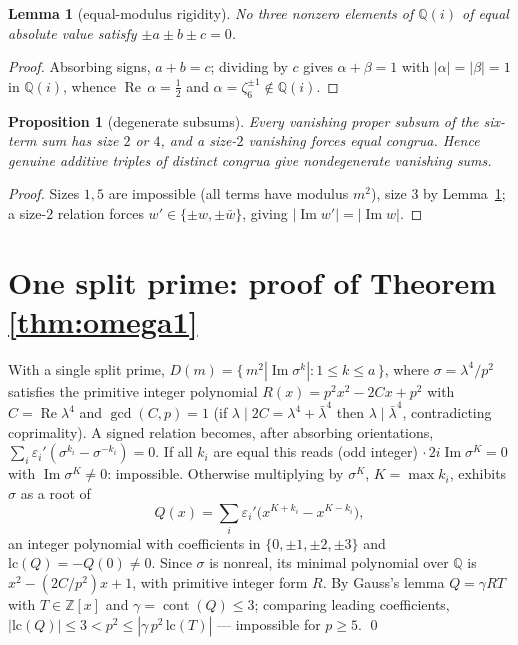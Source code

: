 \documentclass[11pt]{amsart}
\newtheorem{lemma}[theorem]{Lemma}
\newtheorem{proposition}[theorem]{Proposition}
\theoremstyle{definition}
\newcommand{\Z}{\mathbb{Z}}
\newcommand{\Q}{\mathbb{Q}}
\newcommand{\im}{\operatorname{Im}}
\newcommand{\re}{\operatorname{Re}}
\begin{document}
\begin{lemma}[equal-modulus rigidity]\label{lem:rigidity}
No three nonzero elements of $\Q(i)$ of equal absolute value
satisfy $\pm a \pm b \pm c = 0$.
\end{lemma}
\begin{proof}
Absorbing signs, $a+b=c$; dividing by $c$ gives $\alpha + \beta =
1$ with $|\alpha| = |\beta| = 1$ in $\Q(i)$, whence
$\re\,\alpha = \tfrac12$ and $\alpha = \zeta_6^{\pm1} \notin
\Q(i)$.
\end{proof}

\begin{proposition}[degenerate subsums]\label{prop:degenerate}
Every vanishing proper subsum of the six-term sum has size $2$ or
$4$, and a size-$2$ vanishing forces equal congrua. Hence genuine
additive triples of distinct congrua give nondegenerate vanishing
sums.
\end{proposition}
\begin{proof}
Sizes $1, 5$ are impossible (all terms have modulus $m^2$), size
$3$ by Lemma~\ref{lem:rigidity}; a size-$2$ relation forces $w'
\in \{\pm w, \pm\bar w\}$, giving $|\im w'| = |\im w|$.
\end{proof}

\section{One split prime: proof of Theorem \ref{thm:omega1}}

With a single split prime, $D(m) = \{\, m^2 |\im \sigma^k| : 1 \le
k \le a \,\}$, where $\sigma = \lambda^4/p^2$ satisfies the
primitive integer polynomial $R(x) = p^2x^2 - 2Cx + p^2$ with
$C = \re \lambda^4$ and $\gcd(C, p) = 1$ (if $\lambda \mid 2C =
\lambda^4 + \bar\lambda^4$ then $\lambda \mid \bar\lambda^4$,
contradicting coprimality). A signed relation becomes, after
absorbing orientations,
$\sum_i \varepsilon_i'(\sigma^{k_i} - \sigma^{-k_i}) = 0$.
If all $k_i$ are equal this reads (odd integer) $\cdot\,
2i\im\sigma^K = 0$ with $\im \sigma^K \neq 0$: impossible.
Otherwise multiplying by $\sigma^{K}$, $K = \max k_i$, exhibits
$\sigma$ as a root of
\[
Q(x) = \sum_i \varepsilon_i'\bigl(x^{K+k_i} - x^{K-k_i}\bigr),
\]
an integer polynomial with coefficients in $\{0,\pm1,\pm2,\pm3\}$
and $\mathrm{lc}(Q) = -Q(0) \ne 0$. Since $\sigma$ is nonreal, its
minimal polynomial over $\Q$ is $x^2 - (2C/p^2)x + 1$, with
primitive integer form $R$. By Gauss's lemma $Q = \gamma R T$ with
$T \in \Z[x]$ and $\gamma = \operatorname{cont}(Q) \le 3$;
comparing leading coefficients,
$|\mathrm{lc}(Q)| \le 3 < p^2 \le |\gamma\, p^2\, \mathrm{lc}(T)|$
--- impossible for $p \ge 5$. \qed
\end{document}
